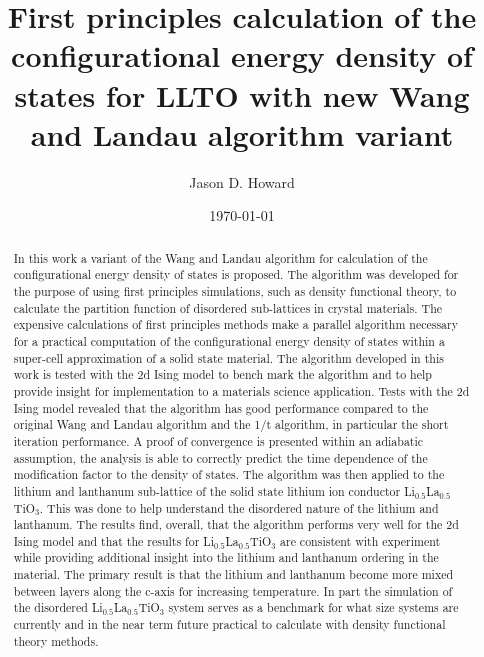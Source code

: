 \documentclass[aps,pre,reprint,superscriptaddress,showkeys]{revtex4-2}
\begin{document}
\newcommand{\RNum}[1]{\uppercase\expandafter{\romannumeral #1\relax}}


\title{First principles calculation of the configurational energy density of states for LLTO with new Wang and Landau algorithm variant }

\author{Jason D. Howard}
\date{\today}


\begin{abstract}
In this work  a variant of the Wang and Landau algorithm   for calculation of  the configurational energy density of states is proposed. The algorithm was developed for the purpose of   using first principles simulations, such as density functional theory, to calculate the partition function of disordered sub-lattices in crystal materials. The expensive calculations of first principles methods make a parallel algorithm necessary for a practical computation of the configurational energy density of states within a super-cell approximation of a solid state material.  The algorithm developed in this work is tested with the 2d Ising model to bench mark the algorithm and to help provide insight for implementation to a materials science application. Tests with the 2d Ising model revealed that the algorithm has good performance compared to the original Wang and Landau algorithm and the 1/t algorithm, in particular the short iteration performance. A proof of convergence is presented within an adiabatic assumption, the analysis is able to correctly predict the time dependence of the modification factor to the density of states.  The algorithm was then applied to the lithium and lanthanum sub-lattice of the solid state lithium ion conductor Li$_{0.5}$La$_{0.5}$TiO$_{3}$. This was done to help understand the disordered nature of the lithium and lanthanum. The results find, overall, that the algorithm performs very well for the 2d Ising model and that the results for Li$_{0.5}$La$_{0.5}$TiO$_{3}$ are consistent with experiment while providing additional insight into the lithium and lanthanum ordering in the material. The primary result is that the lithium and lanthanum become more mixed between layers along the c-axis for increasing temperature. In part the simulation of the disordered Li$_{0.5}$La$_{0.5}$TiO$_{3}$ system serves as a benchmark for what size systems are currently and in the near term future practical to calculate with density functional theory methods. 
\end{abstract}
\maketitle
\end{document}
